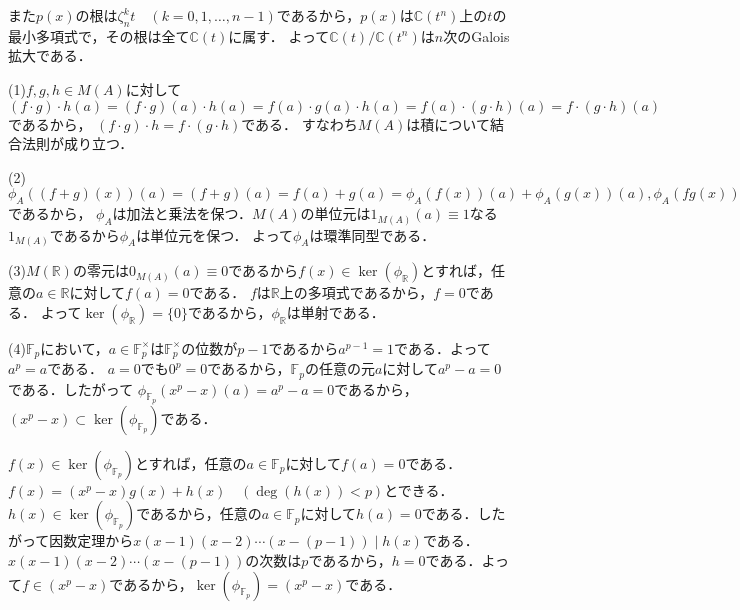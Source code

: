 \documentclass[
		book,
		head_space=20mm,
		foot_space=20mm,
		gutter=10mm,
		line_length=190mm
]{jlreq}
\begin{document}
また$p(x)$の根は$\zeta_n^k t \quad(k=0,1,\ldots,n-1)$であるから，$p(x)$は$\mathbb{C}(t^n)$上の$t$の最小多項式で，その根は全て$\mathbb{C}(t)$に属す．
よって$\mathbb{C}(t)/\mathbb{C}(t^n)$は$n$次のGalois拡大である．

(1)$f,g,h\in M(A)$に対して
$(f\cdot g)\cdot h(a)=(f\cdot g)(a) \cdot h(a)=f(a)\cdot g(a) \cdot h(a)=f(a) \cdot (g\cdot h)(a)=f\cdot (g\cdot h)(a)$であるから，
$(f\cdot g)\cdot h=f\cdot (g\cdot h)$である．
すなわち$M(A)$は積について結合法則が成り立つ．

(2)$\phi_A((f+g)(x))(a)=(f+g)(a)=f(a)+g(a)=\phi_A(f(x))(a)+\phi_A(g(x))(a),\phi_A(fg(x))(a)=(fg)(a)=f(a)g(a)=\phi_A(f(x))(a)\phi_A(g(x))(a),\phi_A(1(x))(a)=1(a)=1$
であるから，
$\phi_A$は加法と乗法を保つ．$M(A)$の単位元は$1_{M(A)}(a)\equiv 1$なる$1_{M(A)}$であるから$\phi_A$は単位元を保つ．
よって$\phi_A$は環準同型である．

(3)$M(\mathbb{R})$の零元は$0_{M(A)}(a)\equiv 0$であるから$f(x)\in \ker(\phi_{\mathbb{R}})$とすれば，任意の$a \in \mathbb{R}$に対して$f(a)=0$である．
$f$は$\mathbb{R}$上の多項式であるから，$f=0$である．
よって$\ker(\phi_{\mathbb{R}})=\{0\}$であるから，$\phi_{\mathbb{R}}$は単射である．

(4)$\mathbb{F}_p$において，$a\in \mathbb{F}_p^\times$は$\mathbb{F}_p^\times$の位数が$p-1$であるから$a^{p-1}=1$である．よって$a^p=a$である．
$a=0$でも$0^p=0$であるから，$\mathbb{F}_p$の任意の元$a$に対して$a^p-a=0$である．したがって
$\phi_{\mathbb{F}_p}(x^p-x)(a)=a^p-a=0$であるから，$(x^p-x)\subset \ker(\phi_{\mathbb{F}_p})$である．

$f(x)\in \ker(\phi_{\mathbb{F}_p})$とすれば，任意の$a\in \mathbb{F}_p$に対して$f(a)=0$である．
$f(x)=(x^p-x)g(x)+h(x)\quad(\deg(h(x))<p)$とできる．
$h(x)\in \ker (\phi_{\mathbb{F}_p})$であるから，任意の$a\in \mathbb{F}_p$に対して$h(a)=0$である．したがって因数定理から$x(x-1)(x-2)\cdots(x-(p-1))\mid h(x)$である．
$x(x-1)(x-2)\cdots(x-(p-1))$の次数は$p$であるから，$h=0$である．よって$f\in (x^p-x)$であるから，$\ker(\phi_{\mathbb{F}_p})=(x^p-x)$である．
\end{document}
